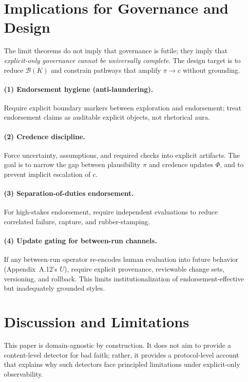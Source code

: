 \documentclass[preprints,article,submit,pdftex,moreauthors,accept]{Definitions/mdpi}
\begin{document}
\section{Implications for Governance and Design}
The limit theorems do not imply that governance is futile; they imply that \emph{explicit-only governance cannot be universally complete}. The design target is to reduce \(\mathcal{B}(K)\) and constrain pathways that amplify \(\pi\to c\) without grounding.

\paragraph{(1) Endorsement hygiene (anti-laundering).}
Require explicit boundary markers between exploration and endorsement; treat endorsement claims as auditable explicit objects, not rhetorical aura.

\paragraph{(2) Credence discipline.}
Force uncertainty, assumptions, and required checks into explicit artifacts. The goal is to narrow the gap between plausibility \(\pi\) and credence updates \(\Phi\), and to prevent implicit escalation of \(c\).

\paragraph{(3) Separation-of-duties endorsement.}
For high-stakes endorsement, require independent evaluations to reduce correlated failure, capture, and rubber-stamping.

\paragraph{(4) Update gating for between-run channels.}
If any between-run operator re-encodes human evaluation into future behavior (Appendix~A.12's \(U\)), require explicit provenance, reviewable change sets, versioning, and rollback. This limits institutionalization of endorsement-effective but inadequately grounded styles.

\section{Discussion and Limitations}
This paper is domain-agnostic by construction. It does not aim to provide a content-level detector for bad faith; rather, it provides a protocol-level account that explains why such detectors face principled limitations under explicit-only observability.
\end{document}
